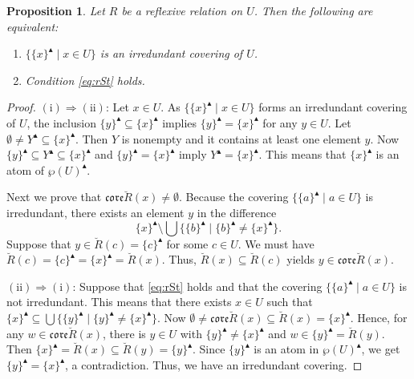 \documentclass[10pt,a4paper]{amsart}
\newtheorem{proposition}{Proposition}
\newcommand{\UP}{\blacktriangle}
\begin{document}
\begin{proposition} \label{prop:irredundant_cover}
Let $R$ be a reflexive relation on $U$. Then the following are equivalent:
\begin{enumerate}[label={\rm (\roman*)}]
\item $\{ \{x\}^\UP \mid x \in U\}$ is an irredundant covering of $U$.

\item Condition \eqref{eq:rSt} holds.
\end{enumerate}
\end{proposition}

\begin{proof}
$\mathrm{(i)}\Rightarrow\mathrm{(ii)}$: Let $x \in U$.
As $\{ \{x\}^\UP \mid x \in U\}$ forms an irredundant 
covering of $U$, the inclusion 
$\{y\}^\UP \subseteq\{x\}^\UP$ implies 
$\{y\}^\UP = \{x\}^\UP$  for any $y \in U$.
Let $\emptyset \neq Y^\UP \subseteq \{x\}^\UP$. Then $Y$ is nonempty
and it contains at least one element $y$.
Now $\{y\}^\UP \subseteq Y^\UP \subseteq \{x\}^\UP$ and 
$\{y\}^\UP = \{x\}^\UP$ imply $Y^\UP = \{x\}^\UP$. This means that $\{x\}^\UP$ is an atom of $\wp(U)^\UP$.

Next we prove that 
$\mathfrak{core}\breve{R}(x) \neq \emptyset$.
Because the covering 
$\{ \{a\}^\UP \mid a \in U\}$ is irredundant,
there exists an element $y$ in the difference
\[
\{x\}^\UP \setminus   
\bigcup \{\{b\}^\UP \mid \{b\}^\UP \neq\{x\}^\UP\}.
\]
Suppose that $y \in \breve{R}(c) = \{c\}^\UP$
for some $c \in U$. We must have 
$\breve{R}(c) = \{c\}^\UP = \{x\}^\UP = \breve{R}(x)$.
Thus, $\breve{R}(x) \subseteq \breve{R}(c)$ yields 
$y \in \mathfrak{core}\breve{R}(x)$.


\medskip\noindent%
$\mathrm{(ii)}\Rightarrow\mathrm{(i)}$: 
Suppose that \eqref{eq:rSt} holds and 
that the covering $\{ \{a\}^\UP \mid a \in U\}$ is 
not irredundant. This means that there exists $x \in U$
such that 
$\{x\}^\UP \subseteq \bigcup\{\{y\}^\UP \mid \{y\}^\UP \neq\{x\}^\UP\}$. 
Now $\emptyset\neq\mathfrak{core}\breve{R}(x) \subseteq\breve{R}(x)
= \{x\}^\UP$. Hence, for any $w \in \mathfrak{core}\breve{R}(x)$,
there is $y\in U$ with $\{y\}^\UP \neq \{x\}^\UP$
and $w\in \{y\}^\UP = \breve{R}(y)$. Then $\{x\}^\UP = \breve{R}(x) 
\subseteq \breve{R}(y) = \{y\}^\UP$. Since
$\{y\}^\UP$ is an atom in $\wp(U)^\UP$, we get
$\{y\}^\UP = \{x\}^\UP$, a contradiction. Thus,
we have an irredundant covering.
\end{proof}
\end{document}
